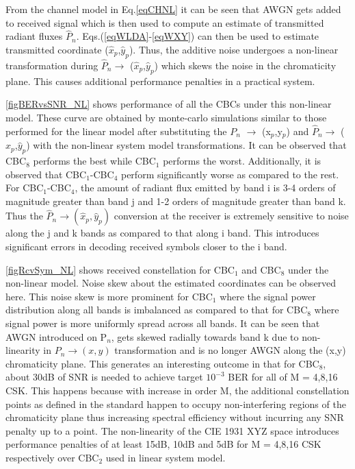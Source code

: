 \documentclass[10pt,letterpaper]{article}
\begin{document}
From the channel model in Eq.\eqref{eqCHNL} it can be seen that AWGN gets added to received signal which is then used to compute an estimate of transmitted radiant fluxes $\hat{P}_{n}$. Eqs.(\ref{eqWLDA}-\ref{eqWXY}) can then be used to estimate transmitted coordinate ($\hat{x}_{p}$,$\hat{y}_{p}$). Thus, the additive noise undergoes a non-linear transformation during $\hat{P}_{n}\rightarrow$ ($\hat{x}_{p}$,$\hat{y}_{p}$) which skews the noise in the chromaticity plane. This causes additional performance penalties in a practical system.

\figurename\ref{figBERvsSNR_NL} shows performance of all the CBCs under this non-linear model. These curve are obtained by monte-carlo simulations similar to those performed for the linear model after substituting the $P_{n}$ $\rightarrow$ (x$_{p}$,y$_{p}$) and $\hat{P}_{n}\rightarrow$ ($\hat{x}_{p}$,$\hat{y}_{p}$) with the non-linear system model transformations. It can be observed that CBC$_{8}$ performs the best while CBC$_{1}$ performs the worst. Additionally, it is observed that CBC$_{1}$-CBC$_{4}$ perform significantly worse as compared to the rest. For CBC$_{1}$-CBC$_{4}$, the amount of radiant flux emitted by band i is 3-4 orders of magnitude greater than band j and 1-2 orders of magnitude greater than band k. Thus the $\hat{P}_{n}\rightarrow (\hat{x}_{p},\hat{y}_{p})$ conversion at the receiver is extremely sensitive to noise along the j and k bands as compared to that along i band. This introduces significant errors in decoding received symbols closer to the i band.

\figurename\ref{figRcvSym_NL} shows received constellation for CBC$_{1}$ and CBC$_{8}$ under the non-linear model. Noise skew about the estimated coordinates can be observed here. This noise skew is more prominent for CBC$_{1}$ where the signal power distribution along all bands is imbalanced as compared to that for CBC$_{8}$ where signal power is more uniformly spread across all bands. It can be seen that AWGN introduced on P$_{n}$, gets skewed radially towards band k due to non-linearity in $P_{n}\rightarrow (x,y)$ transformation and is no longer AWGN along the (x,y) chromaticity plane. This generates an interesting outcome in that for CBC$_{8}$, about 30dB of SNR is needed to achieve target $10^{-3}$ BER for all of M = 4,8,16 CSK. This happens because with increase in order M, the additional constellation points as defined in the standard happen to occupy non-interfering regions of the chromaticity plane thus increasing spectral efficiency without incurring any SNR penalty up to a point. The non-linearity of the CIE 1931 XYZ space introduces performance penalties of at least 15dB, 10dB and 5dB for M = 4,8,16 CSK respectively over CBC$_{2}$ used in linear system model.
\end{document}
